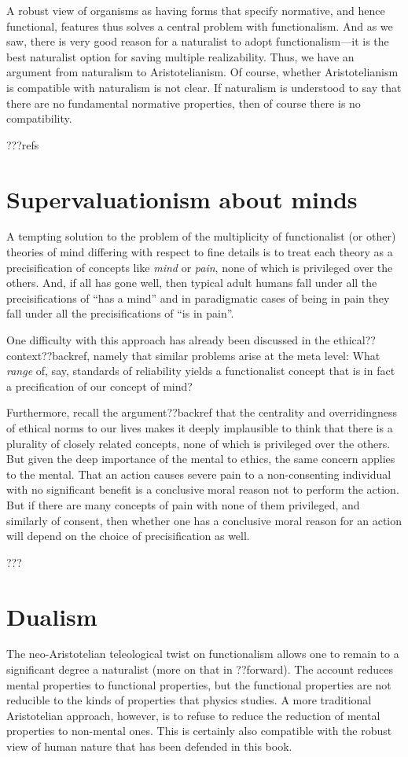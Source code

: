 A robust view of organisms as having forms that specify normative, and hence functional, features thus solves a central
problem with functionalism. And as we saw, there is very good reason for a naturalist to adopt functionalism---it is the
best naturalist option for saving multiple realizability. Thus, we have an argument from naturalism to Aristotelianism.
Of course, whether Aristotelianism is compatible with naturalism is not clear. If naturalism is understood to say that 
there are no fundamental normative properties, then of course there is no compatibility.

???refs

\section{Supervaluationism about minds}
A tempting solution to the problem of the multiplicity of functionalist (or other) theories of mind differing with respect
to fine details is to treat each theory as a precisification of concepts like \textit{mind} or \textit{pain}, none of which
is privileged over the others. And,
if all has gone well, then typical adult humans fall under all the precisifications of ``has a mind'' and in paradigmatic
cases of being in pain they fall under all the precisifications of ``is in pain''. 

One difficulty with this approach has already been discussed in the ethical?? context??backref, namely that similar problems
arise at the meta level: What \textit{range} of, say, standards of reliability yields a functionalist concept that is in fact a 
precification of our concept of mind? 

Furthermore, recall the argument??backref that the centrality and overridingness of ethical norms to our lives makes it 
deeply implausible to think that there is a plurality of closely related concepts, none of which is privileged over the others.
But given the deep importance of the mental to ethics, the same concern applies to the mental. That an action causes severe
pain to a non-consenting individual with no significant benefit is a conclusive moral reason not to perform the action. 
But if there are many concepts of pain with none of them privileged, and similarly of consent, then whether one has a
conclusive moral reason for an action will depend on the choice of precisification as well.

???

\section{Dualism}\label{sec:dualism}
The neo-Aristotelian teleological twist on functionalism allows one to remain to a significant degree a naturalist (more on that
in ??forward). The account reduces mental properties to functional properties, but the functional properties are not 
reducible to the kinds of properties that physics studies. A more traditional Aristotelian approach, however, is to refuse
to reduce the reduction of mental properties to non-mental ones. This is certainly also compatible with the robust view of
human nature that has been defended in this book. 

